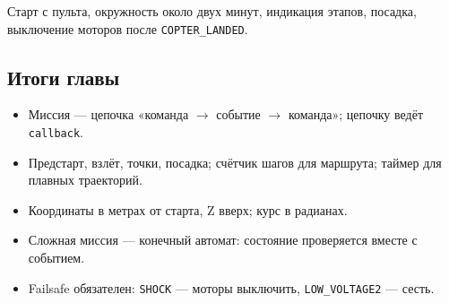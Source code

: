 \begin{taskbox}[Демонстрация]
Старт с пульта, окружность около двух минут, индикация этапов, посадка, выключение моторов после \verb|COPTER_LANDED|.
\end{taskbox}

\subsection*{Итоги главы}
\begin{itemize}
    \item Миссия --- цепочка «команда $\to$ событие $\to$ команда»; цепочку ведёт \verb|callback|.
    \item Предстарт, взлёт, точки, посадка; счётчик шагов для маршрута; таймер для плавных траекторий.
    \item Координаты в метрах от старта, Z вверх; курс в радианах.
    \item Сложная миссия --- конечный автомат: состояние проверяется вместе с событием.
    \item Failsafe обязателен: \verb|SHOCK| --- моторы выключить, \verb|LOW_VOLTAGE2| --- сесть.
\end{itemize}
